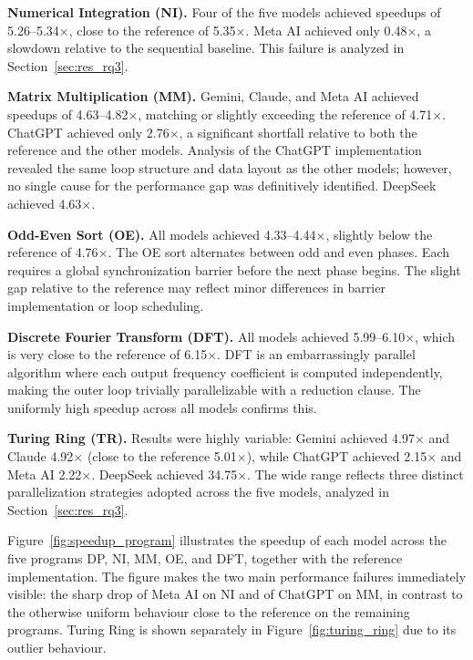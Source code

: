 \documentclass[conference]{IEEEtran}
\begin{document}
\textbf{Numerical Integration (NI).} Four of the five models achieved speedups of 5.26--5.34$\times$, close to the reference of 5.35$\times$. Meta AI achieved only 0.48$\times$, a slowdown relative to the sequential baseline. This failure is analyzed in Section~\ref{sec:res_rq3}.

\textbf{Matrix Multiplication (MM).} Gemini, Claude, and Meta AI achieved speedups of 4.63--4.82$\times$, matching or slightly exceeding the reference of 4.71$\times$. ChatGPT achieved only 2.76$\times$, a significant shortfall relative to both the reference and the other models. Analysis of the ChatGPT implementation revealed the same loop structure and data layout as the other models; however, no single cause for the performance gap was definitively identified. DeepSeek achieved 4.63$\times$.

\textbf{Odd-Even Sort (OE).} All models achieved 4.33--4.44$\times$, slightly below the reference of 4.76$\times$. 
The OE sort alternates between odd and even phases.
Each requires a global synchronization barrier before the next phase begins. 
The slight gap relative to the reference may reflect minor differences in barrier implementation or loop scheduling.

\textbf{Discrete Fourier Transform (DFT).} All models achieved 5.99--6.10$\times$, which is very close to the reference of 6.15$\times$. DFT is an embarrassingly parallel algorithm where each output frequency coefficient is computed independently, making the outer loop trivially parallelizable with a reduction clause. The uniformly high speedup across all models confirms this.

\textbf{Turing Ring (TR).} Results were highly variable: Gemini achieved 4.97$\times$ and Claude 4.92$\times$ (close to the reference 5.01$\times$), while ChatGPT achieved 2.15$\times$ and Meta AI 2.22$\times$. DeepSeek achieved 34.75$\times$. The wide range reflects three distinct parallelization strategies adopted across the five models, analyzed in Section~\ref{sec:res_rq3}.

Figure~\ref{fig:speedup_program} illustrates the speedup of each model across the five programs DP, NI, MM, OE, and DFT, together with the reference implementation. The figure makes the two main performance failures immediately visible: the sharp drop of Meta AI on NI and of ChatGPT on MM, in contrast to the otherwise uniform behaviour close to the reference on the remaining programs. Turing Ring is shown separately in Figure~\ref{fig:turing_ring} due to its outlier behaviour.
\end{document}
